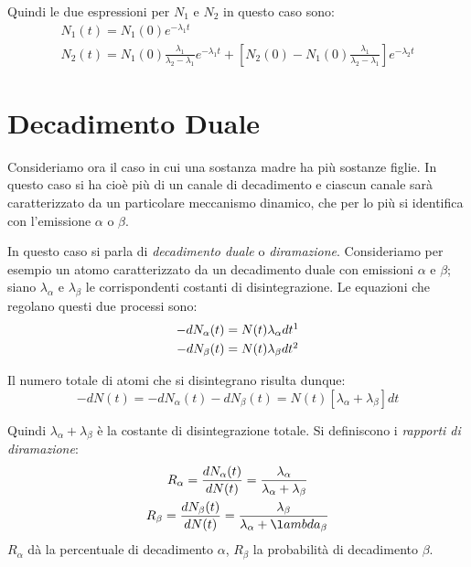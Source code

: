 Quindi le due espressioni per $N_1$ e $N_2$ in questo 
caso sono:
\begin{gather}
N_1(t)=N_1(0)e^{-\lambda_1t}\\
N_2(t)=N_1(0)\frac{\lambda_1}{\lambda_2-\lambda_1}e^{-\lambda_1t}+[N_2(0)-N_1(0)
\frac{\lambda_1}{\lambda_2-\lambda_1}]e^{-\lambda_2t}
\end{gather}
\section{Decadimento Duale}
Consideriamo ora il caso in cui una sostanza madre ha più sostanze figlie.
In questo caso si ha cioè più di un canale di decadimento e ciascun canale 
sarà caratterizzato da un particolare meccanismo dinamico,
che per lo più si identifica con l'emissione $\alpha$ o $\beta$.

In questo caso si parla di \textit{decadimento duale} o \textit{diramazione}.
Consideriamo per esempio un atomo caratterizzato da un decadimento duale con 
emissioni $\alpha$ e $\beta$;
siano $\lambda_{\alpha}$ e $\lambda_{\beta}$ le corrispondenti costanti di 
disintegrazione.
Le equazioni che regolano questi due processi sono:
\begin{gather}
-dN_{\alpha}(t)=N(t)\lambda_{\alpha}dt\footnotemark\\
-dN_{\beta}(t)=N(t)\lambda_{\beta}dt\footnotemark
\end{gather}

\addtocounter{footnote}{-1}

Il numero totale di atomi che si disintegrano risulta dunque:
\begin{equation}
-dN(t)=-dN_{\alpha}(t)-dN_{\beta}(t)=N(t)[\lambda_{\alpha}+\lambda_{\beta}]dt
\end{equation}

Quindi $\lambda_{\alpha}+\lambda_{\beta}$ è la costante di disintegrazione 
totale. Si definiscono i \textit{rapporti di diramazione}:
\begin{gather}
R_{\alpha}=\frac{dN_{\alpha}(t)}{dN(t)}=\frac{\lambda_{\alpha}}{\lambda_{\alpha}
+\lambda_{\beta}}\\
R_{\beta}=\frac{dN_{\beta}(t)}{dN(t)}=\frac{\lambda_{\beta}}{\lambda_{\alpha}+\l
ambda_{\beta}}
\end{gather}
$R_{\alpha}$ dà la percentuale di decadimento $\alpha$, $R_{\beta}$ la 
probabilità di decadimento $\beta$.

